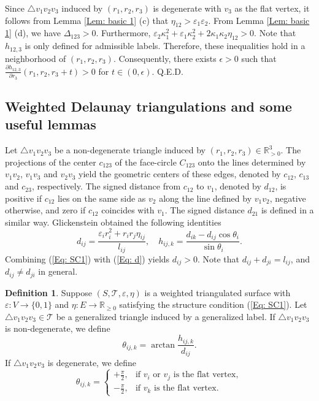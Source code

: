 \documentclass[12pt]{amsart}
\theoremstyle{definition}
\newtheorem{definition}[theorem]{Definition}
\def\qed{\hfill{Q.E.D.}\smallskip}
\begin{document}
Since $\triangle v_1v_2v_3$ induced by $(r_1,r_2,r_3)$ is degenerate with $v_3$ as the flat vertex, 
it follows from Lemma \ref{Lem: basic 1} (c) that $\eta_{12}>\varepsilon_1\varepsilon_2$. 
From Lemma \ref{Lem: basic 1} (d), we have $\Delta_{123}>0$. 
Furthermore, $\varepsilon_2\kappa_1^2+\varepsilon_1\kappa_2^2 +2\kappa_1\kappa_2\eta_{12}>0$. 
Note that $h_{12,3}$ is only defined for admissible labels. 
Therefore, these inequalities hold in a neighborhood of $(r_1, r_2, r_3)$. 
Consequently, there exists $\epsilon>0$ such that $\frac{\partial h_{12,3}}{\partial r_3}(r_1, r_2, r_3+t)>0$ for $t\in (0, \epsilon)$.
\qed

\subsection{Weighted Delaunay triangulations and some useful lemmas}
\label{Sec: weighted Delaunay}

Let $\triangle v_1v_2v_3$ be a non-degenerate triangle induced by $(r_1,r_2,r_3)\in\mathbb{R}^3_{>0}$. 
The projections of the center $c_{123}$ of the face-circle $C_{123}$ onto the lines determined by $v_1v_2$, $v_1v_3$ and $v_2v_3$ yield the geometric centers of these edges, denoted by $c_{12}$, $c_{13}$ and $c_{23}$, respectively. 
The signed distance from $c_{12}$ to $v_1$, denoted by $d_{12}$, is positive if $c_{12}$ lies on the same side as $v_2$ along the line defined by $v_1v_2$, negative otherwise, and zero if $c_{12}$ coincides with $v_1$. 
The signed distance $d_{21}$ is defined in a similar way. 
Glickenstein \cite{Glickenstein JDG} obtained the following identities
\begin{equation}\label{Eq: d}
d_{ij}=\frac{\varepsilon_ir_i^2+r_ir_j\eta_{ij}}{l_{ij}}, \quad h_{ij,k}=\frac{d_{ik}-d_{ij}\cos \theta_i}{\sin \theta_i}.
\end{equation}
Combining (\ref{Eq: SC1}) with (\ref{Eq: d}) yields $d_{ij}>0$. 
Note that $d_{ij}+d_{ji}=l_{ij}$, and $d_{ij}\neq d_{ji}$ in general.

\begin{definition}\label{Def: theta}
Suppose $(S,\mathcal{T},\varepsilon,\eta)$ is a weighted triangulated surface with $\varepsilon: V\rightarrow \{0,1\}$ and $\eta: E\rightarrow \mathbb{R}_{\geq 0}$ satisfying the structure condition (\ref{Eq: SC1}).
Let $\triangle v_1v_2v_3\in \mathcal{T}$ be a generalized triangle induced by a generalized label.
If $\triangle v_1v_2v_3$ is non-degenerate, we define
\begin{equation}\label{Eq: F6}
\theta_{ij,k}=\arctan\frac{h_{ij,k}}{d_{ij}}.
\end{equation}
If $\triangle v_1v_2v_3$ is degenerate, we define 
\begin{equation}\label{Eq: F7}
\theta_{ij,k}=
\begin{cases} 
+\frac{\pi}{2}, & \text{if $v_i$ or $v_{j}$ is the flat vertex}, \\
-\frac{\pi}{2}, & \text{if $v_k$ is the flat vertex}.
\end{cases}
\end{equation}
\end{definition}
\end{document}

